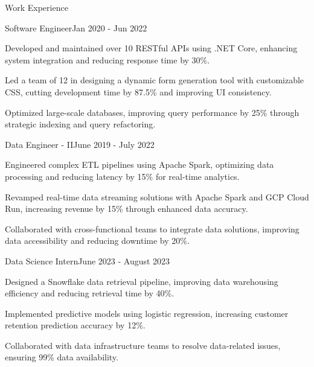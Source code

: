 \documentclass{resume} %
\begin{document}
    \begin{rSection}{Work Experience}
                    \begin{rSubsection}
                {Software Engineer}{Jan 2020 - Jun 2022}
                                    {}
                                {}
                                    \item Developed and maintained over 10 RESTful APIs using .NET Core, enhancing system integration and reducing response time by 30\%.
                                    \item Led a team of 12 in designing a dynamic form generation tool with customizable CSS, cutting development time by 87.5\% and improving UI consistency.
                                    \item Optimized large{-}scale databases, improving query performance by 25\% through strategic indexing and query refactoring.
                            \end{rSubsection}
                    \begin{rSubsection}
                {Data Engineer {-} II}{June 2019 - July 2022}
                                    {}
                                {}
                                    \item Engineered complex ETL pipelines using Apache Spark, optimizing data processing and reducing latency by 15\% for real{-}time analytics.
                                    \item Revamped real{-}time data streaming solutions with Apache Spark and GCP Cloud Run, increasing revenue by 15\% through enhanced data accuracy.
                                    \item Collaborated with cross{-}functional teams to integrate data solutions, improving data accessibility and reducing downtime by 20\%.
                            \end{rSubsection}
                    \begin{rSubsection}
                {Data Science Intern}{June 2023 - August 2023}
                                    {}
                                {}
                                    \item Designed a Snowflake data retrieval pipeline, improving data warehousing efficiency and reducing retrieval time by 40\%.
                                    \item Implemented predictive models using logistic regression, increasing customer retention prediction accuracy by 12\%.
                                    \item Collaborated with data infrastructure teams to resolve data{-}related issues, ensuring 99\% data availability.
                            \end{rSubsection}
            \end{rSection}
\end{document}
